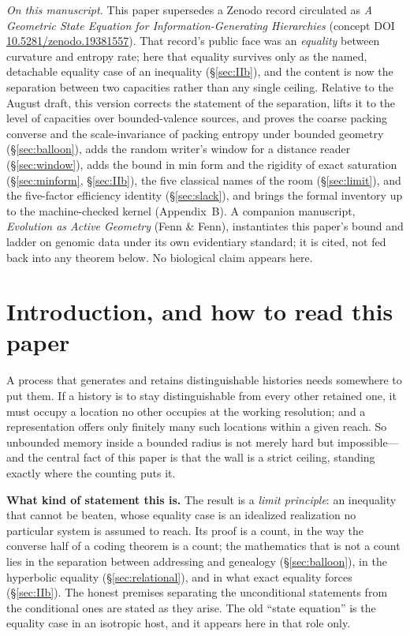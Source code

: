 \documentclass[11pt,reqno]{amsart}
\theoremstyle{plain}
\theoremstyle{definition}
\begin{document}
{\small\noindent\emph{On this manuscript.} This paper supersedes a Zenodo record circulated as \emph{A Geometric State Equation for Information-Generating Hierarchies} (concept DOI \href{https://doi.org/10.5281/zenodo.19381557}{10.5281/zenodo.19381557}). That record's public face was an \emph{equality} between curvature and entropy rate; here that equality survives only as the named, detachable equality case of an inequality (\S\ref{sec:IIb}), and the content is now the separation between two capacities rather than any single ceiling. Relative to the August draft, this version corrects the statement of the separation, lifts it to the level of capacities over bounded-valence sources, and proves the coarse packing converse and the scale-invariance of packing entropy under bounded geometry (\S\ref{sec:balloon}), adds the random writer's window for a distance reader (\S\ref{sec:window}), adds the bound in min form and the rigidity of exact saturation (\S\ref{sec:minform}, \S\ref{sec:IIb}), the five classical names of the room (\S\ref{sec:limit}), and the five-factor efficiency identity (\S\ref{sec:slack}), and brings the formal inventory up to the machine-checked kernel (Appendix~B). A companion manuscript, \emph{Evolution as Active Geometry} (Fenn \& Fenn), instantiates this paper's bound and ladder on genomic data under its own evidentiary standard; it is cited, not fed back into any theorem below. No biological claim appears here.\par}

\section{Introduction, and how to read this paper}

A process that generates and retains distinguishable histories needs somewhere to put them. If a history is to stay distinguishable from every other retained one, it must occupy a location no other occupies at the working resolution; and a representation offers only finitely many such locations within a given reach. So unbounded memory inside a bounded radius is not merely hard but impossible---and the central fact of this paper is that the wall is a strict ceiling, standing exactly where the counting puts it.

\medskip
\noindent\textbf{What kind of statement this is.} The result is a \emph{limit principle}: an inequality that cannot be beaten, whose equality case is an idealized realization no particular system is assumed to reach. Its proof is a count, in the way the converse half of a coding theorem is a count; the mathematics that is not a count lies in the separation between addressing and genealogy (\S\ref{sec:balloon}), in the hyperbolic equality (\S\ref{sec:relational}), and in what exact equality forces (\S\ref{sec:IIb}). The honest premises separating the unconditional statements from the conditional ones are stated as they arise. The old ``state equation'' is the equality case in an isotropic host, and it appears here in that role only.
\end{document}
